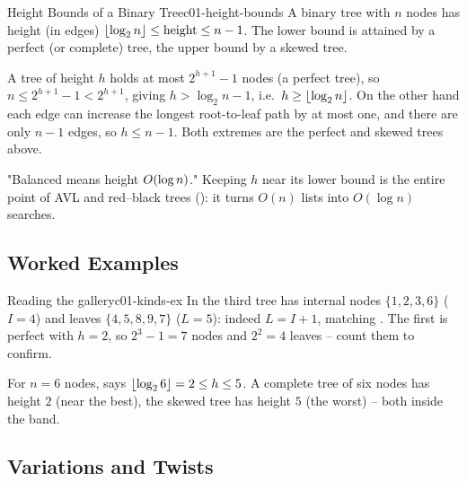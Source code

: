 \begin{corollary}{Height Bounds of a Binary Tree}{c01-height-bounds}
A binary tree with $n$ nodes has height (in edges)
$\lfloor\log_2 n\rfloor \le \operatorname{height} \le n-1$. The lower bound is attained by a perfect (or
complete) tree, the upper bound by a skewed tree.
\end{corollary}
\begin{proofbox}
A tree of height $h$ holds at most $2^{h+1}-1$ nodes (a perfect tree), so $n \le
2^{h+1}-1 < 2^{h+1}$, giving $h > \log_2 n - 1$, i.e.\ $h \ge \lfloor\log_2 n\rfloor$. On the
other hand each edge can increase the longest root-to-leaf path by at most one, and there
are only $n-1$ edges, so $h \le n-1$. Both extremes are the perfect and skewed trees
above.
\end{proofbox}
\begin{insightbox}
"Balanced means height $O(\log n)$." Keeping $h$ near its lower bound is the entire
point of AVL and red--black trees (): it turns $O(n)$ lists into $O(\log n)$
searches.
\end{insightbox}


\subsection{Worked Examples}

\begin{example}{Reading the gallery}{c01-kinds-ex}
In  the third tree has internal nodes $\{1,2,3,6\}$ ($I=4$) and leaves
$\{4,5,8,9,7\}$ ($L=5$): indeed $L = I+1$, matching . The
first is perfect with $h=2$, so $2^{3}-1 = 7$ nodes and $2^2 = 4$ leaves -- count them to
confirm.
\end{example}

\begin{tracebox}
For $n=6$ nodes,  says $\lfloor\log_2 6\rfloor=2 \le h \le 5$. A
complete tree of six nodes has height $2$ (near the best), the skewed tree has height $5$
(the worst) -- both inside the band.
\end{tracebox}

\subsection{Variations and Twists}

